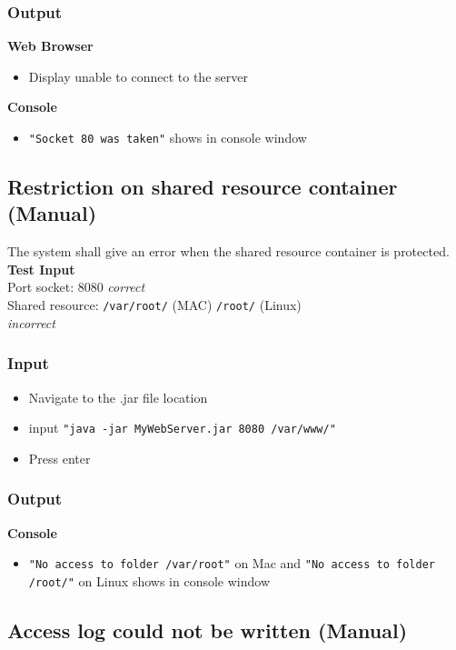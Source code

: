 \documentclass[a4paper, 12pt]{article}
\begin{document}
\subsubsection{Output}
\textbf{Web Browser}
\begin{itemize}
\item Display unable to connect to the server
\end{itemize}

\textbf{Console}
\begin{itemize}
\item \texttt{"Socket 80 was taken"} shows in console window
\end{itemize}

\subsection{Restriction on shared resource container (Manual)}

The system shall give an error when the shared resource container is protected.\\
\textbf{Test Input} \\ Port socket: 8080 \textit{correct} \\ Shared resource: \texttt{/var/root/} (MAC) \texttt{/root/} (Linux) \\ \textit{incorrect}
 
\subsubsection{Input}
\begin{itemize}
\item Navigate to the .jar file location
\item input \texttt{"java -jar MyWebServer.jar 8080 /var/www/"}
\item Press enter
\end{itemize} 

\subsubsection{Output}
\textbf{Console}
\begin{itemize}
\item \texttt{"No access to folder /var/root"} on Mac and \texttt{"No access to folder /root/"} on Linux shows in console window
\end{itemize}

\subsection{Access log could not be written (Manual)}
\end{document}
